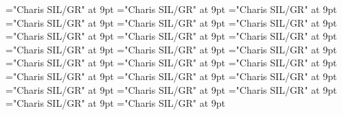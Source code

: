 \documentclass[gps1,twoside]{article}
\begin{document}
\font\spanowningentrysummarydefinitionvariantformentrybackrefvariantformentrybackrefssensesensessensesensessubentrysubentriesentrylastchildafter="Charis SIL/GR" at 9pt
\font\scientificnamesensesensessensesensessubentrysubentriesentryafter="Charis SIL/GR" at 9pt
\font\semanticdomainsemanticdomainsemanticdomainssensesensessensesensessubentrysubentriesentrybefore="Charis SIL/GR" at 9pt
\font\semanticdomainssensesensessensesensessubentrysubentriesentrybefore="Charis SIL/GR" at 9pt
\font\semanticdomainssensesensessensesensessubentrysubentriesentryafter="Charis SIL/GR" at 9pt
\font\spanspanabbreviationsemanticdomainsemanticdomainssensesensessensesensessubentrysubentriesentrybefore="Charis SIL/GR" at 9pt
\font\spanabbreviationsemanticdomainsemanticdomainssensesensessensesensessubentrysubentriesentrylastchildafter="Charis SIL/GR" at 9pt
\font\spanspannamesemanticdomainsemanticdomainssensesensessensesensessubentrysubentriesentrybefore="Charis SIL/GR" at 9pt
\font\academicdomainacademicdomainacademicdomainssensesensessensesensessubentrysubentriesentrybefore="Charis SIL/GR" at 9pt
\font\academicdomainssensesensessensesensessubentrysubentriesentrybefore="Charis SIL/GR" at 9pt
\font\academicdomainssensesensessensesensessubentrysubentriesentryafter="Charis SIL/GR" at 9pt
\font\spanspanabbreviationacademicdomainacademicdomainssensesensessensesensessubentrysubentriesentrybefore="Charis SIL/GR" at 9pt
\font\spanspannameacademicdomainacademicdomainssensesensessensesensessubentrysubentriesentrybefore="Charis SIL/GR" at 9pt
\font\spannameacademicdomainacademicdomainssensesensessensesensessubentrysubentriesentryfirstchildbefore="Charis SIL/GR" at 9pt
\font\spannameacademicdomainacademicdomainssensesensessensesensessubentrysubentriesentrylastchildafter="Charis SIL/GR" at 9pt
\font\usageusageusagessensesensessensesensessubentrysubentriesentrybefore="Charis SIL/GR" at 9pt
\font\usagessensesensessensesensessubentrysubentriesentrybefore="Charis SIL/GR" at 9pt
\font\usagessensesensessensesensessubentrysubentriesentryafter="Charis SIL/GR" at 9pt
\font\spanspanabbreviationusageusagessensesensessensesensessubentrysubentriesentrybefore="Charis SIL/GR" at 9pt
\font\visiblecomplexformbackrefvisiblecomplexformbackrefvisiblecomplexformbackrefssensesensessensesensessubentrysubentriesentrybefore="Charis SIL/GR" at 9pt
\font\visiblecomplexformbackrefssensesensessensesensessubentrysubentriesentryafter="Charis SIL/GR" at 9pt
\font\complexformtypesvisiblecomplexformbackrefvisiblecomplexformbackrefssensesensessensesensessubentrysubentriesentryafter="Charis SIL/GR" at 9pt
\font\spanspanreverseabbrcomplexformtypecomplexformtypesvisiblecomplexformbackrefvisiblecomplexformbackrefssensesensessensesensessubentrysubentriesentrybefore="Charis SIL/GR" at 9pt
\end{document}
